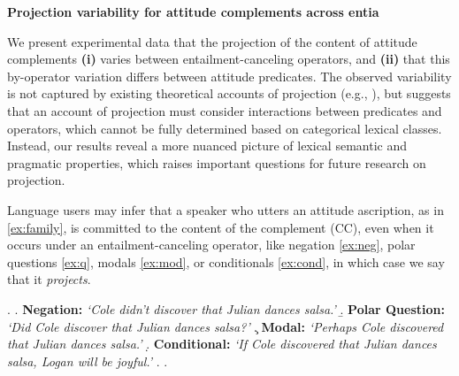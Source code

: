 \documentclass[12pt, a4paper]{article}
\begin{document}


\begin{center}
	\textbf{\large%
		Projection variability for attitude complements across entia}
\end{center}

\vspace{-.7\baselineskip}
\noindent 
	We present experimental data that the projection of the content of attitude complements \textbf{(i)} varies between entailment-canceling operators, and \textbf{(ii)} that this by-operator variation differs between attitude predicates.
	The observed variability is not captured by existing theoretical accounts of projection (e.g.,
	\citealt{heim_projection_1983,van_der_sandt_presupposition_1992,abrusan_predicting_2011,schlenker_triggering_2021}), but suggests that an account of projection must consider interactions between predicates and operators, which cannot be fully determined based on categorical lexical classes. Instead, our results reveal a more nuanced picture of lexical semantic and pragmatic properties, which raises important questions for future research on projection.
	
	Language users may infer that a speaker who utters an attitude ascription, as in \ref{ex:family}, is committed to the content of the complement (CC),
	even when it occurs under an entailment-canceling operator, like negation \ref{ex:neg}, polar questions \ref{ex:q}, modals \ref{ex:mod}, or conditionals \ref{ex:cond}, in which case we say that it \emph{projects}.

	\vspace{-.5\baselineskip}
	\ex. \label{ex:family}
		\a. \label{ex:neg}
			{\bf Negation:} \hfill
			\emph{\lq Cole didn't discover that Julian dances salsa.\rq}
		\b. \label{ex:q}
			{\bf Polar Question:} \hfill
			\emph{\lq Did Cole discover that Julian dances salsa?\rq}
		\c. \label{ex:mod}
			{\bf Modal:} \hfill
			\emph{\lq Perhaps Cole discovered that Julian dances salsa.\rq}
		\d. \label{ex:cond}
			{\bf Conditional:} \hfill
			\emph{\lq If Cole discovered that Julian dances salsa, Logan will be joyful.\rq}
		\z.
	\z.
	
\end{document}
